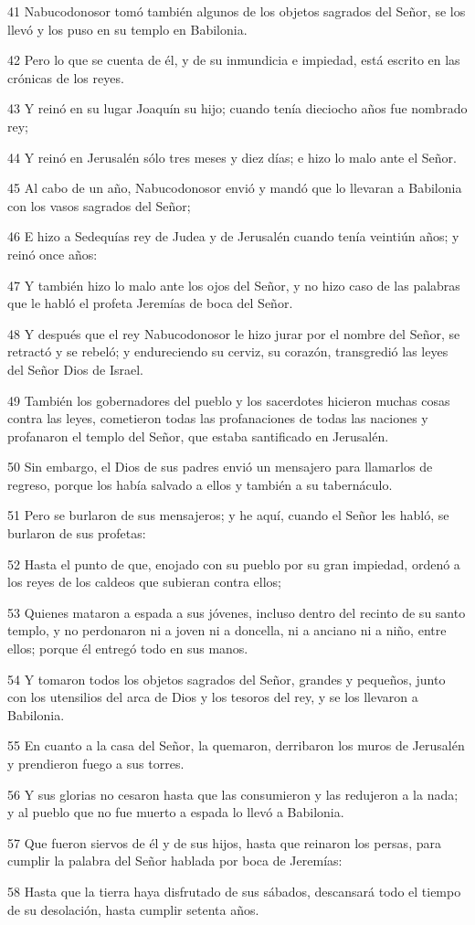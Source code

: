 \par 41 Nabucodonosor tomó también algunos de los objetos sagrados del Señor, se los llevó y los puso en su templo en Babilonia.
\par 42 Pero lo que se cuenta de él, y de su inmundicia e impiedad, está escrito en las crónicas de los reyes.
\par 43 Y reinó en su lugar Joaquín su hijo; cuando tenía dieciocho años fue nombrado rey;
\par 44 Y reinó en Jerusalén sólo tres meses y diez días; e hizo lo malo ante el Señor.
\par 45 Al cabo de un año, Nabucodonosor envió y mandó que lo llevaran a Babilonia con los vasos sagrados del Señor;
\par 46 E hizo a Sedequías rey de Judea y de Jerusalén cuando tenía veintiún años; y reinó once años:
\par 47 Y también hizo lo malo ante los ojos del Señor, y no hizo caso de las palabras que le habló el profeta Jeremías de boca del Señor.
\par 48 Y después que el rey Nabucodonosor le hizo jurar por el nombre del Señor, se retractó y se rebeló; y endureciendo su cerviz, su corazón, transgredió las leyes del Señor Dios de Israel.
\par 49 También los gobernadores del pueblo y los sacerdotes hicieron muchas cosas contra las leyes, cometieron todas las profanaciones de todas las naciones y profanaron el templo del Señor, que estaba santificado en Jerusalén.
\par 50 Sin embargo, el Dios de sus padres envió un mensajero para llamarlos de regreso, porque los había salvado a ellos y también a su tabernáculo.
\par 51 Pero se burlaron de sus mensajeros; y he aquí, cuando el Señor les habló, se burlaron de sus profetas:
\par 52 Hasta el punto de que, enojado con su pueblo por su gran impiedad, ordenó a los reyes de los caldeos que subieran contra ellos;
\par 53 Quienes mataron a espada a sus jóvenes, incluso dentro del recinto de su santo templo, y no perdonaron ni a joven ni a doncella, ni a anciano ni a niño, entre ellos; porque él entregó todo en sus manos.
\par 54 Y tomaron todos los objetos sagrados del Señor, grandes y pequeños, junto con los utensilios del arca de Dios y los tesoros del rey, y se los llevaron a Babilonia.
\par 55 En cuanto a la casa del Señor, la quemaron, derribaron los muros de Jerusalén y prendieron fuego a sus torres.
\par 56 Y sus glorias no cesaron hasta que las consumieron y las redujeron a la nada; y al pueblo que no fue muerto a espada lo llevó a Babilonia.
\par 57 Que fueron siervos de él y de sus hijos, hasta que reinaron los persas, para cumplir la palabra del Señor hablada por boca de Jeremías:
\par 58 Hasta que la tierra haya disfrutado de sus sábados, descansará todo el tiempo de su desolación, hasta cumplir setenta años.

